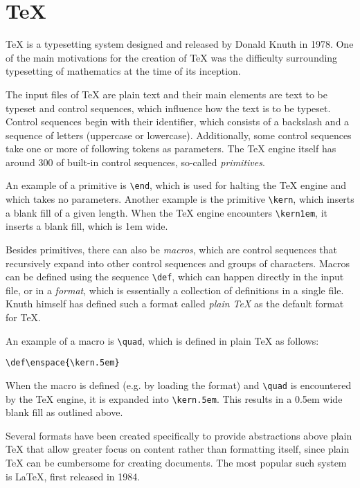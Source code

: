 \documentclass[
  digital,     %
  oneside,     %
  nosansbold,  %
  nocolorbold, %
  lof,         %
  lot,         %
]{fithesis4}
\newcommand\macro[1]{\texttt{\textbackslash{}{#1}}}
\begin{document}
\section{\TeX{}}
\TeX{} is a typesetting system designed and released by Donald Knuth in 1978. One of the main motivations for the creation of \TeX{} was the difficulty surrounding typesetting of mathematics at the time of its inception.

The input files of \TeX{} are plain text and their main elements are text to be typeset and control sequences, which influence how the text is to be typeset. 
Control sequences begin with their identifier, which consists of a backslash and a sequence of letters (uppercase or lowercase). Additionally, some control sequences take one or more of following tokens as parameters. The \TeX{} engine itself has around 300 of built-in control sequences, so-called \textit{primitives}.

An example of a primitive is \macro{end}, which is used for halting the \TeX{} engine and which takes no parameters. Another example is the primitive \macro{kern}, which inserts a blank fill of a given length. When the \TeX{} engine encounters \macro{kern1em}, it inserts a blank fill, which is 1em wide.

Besides primitives, there can also be \textit{macros}, which are control sequences that recursively expand into other control sequences and groups of characters. Macros can be defined using the sequence \macro{def}, which can happen directly in the input file, or in a \textit{format}, which is essentially a collection of definitions in a single file. Knuth himself has defined such a format called \textit{plain \TeX{}} as the default format for \TeX{}.

An example of a macro is \macro{quad}, which is defined in plain \TeX{} as follows:

\noindent
\lstset{language=[plain]TeX}
\begin{lstlisting}
\def\enspace{\kern.5em}
\end{lstlisting}

When the macro is defined (e.g. by loading the format) and \macro{quad} is encountered by the \TeX{} engine, it is expanded into \macro{kern.5em}. This results in a 0.5em wide blank fill as outlined above.

Several formats have been created specifically to provide abstractions above plain \TeX{} that allow greater focus on content rather than formatting itself, since plain \TeX{} can be cumbersome for creating documents. The most popular such system is \LaTeX{}, first released in 1984.
\end{document}
